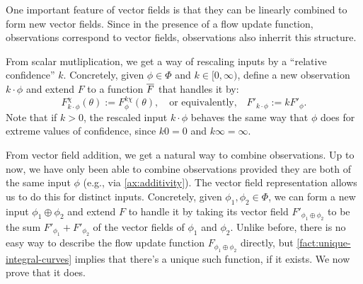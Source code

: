One important feature of vector fields is that they
can be linearly combined to form new vector fields.
Since in the presence of a flow update function,
observations correspond to vector fields,
observations also inherrit this structure.

From scalar mutliplication, we get a way of rescaling
inputs 
by a ``relative confidence'' $k
$.
Concretely, given $\phi \in \Phi$ and $k \in [0,\infty)$, 
define a new observation 
$k\cdot\phi$
and extend $F$ to
a function $\overline F$ that handles it by:
\[
	F^{\chi}_{k\cdot\phi}(\theta) := F^{k\chi}_{\phi}(\theta)
	,\quad\text{or equivalently,}\quad
	F'_{k\cdot \phi} := k F'_{\phi}
	.
\]
Note that if $k > 0$, the rescaled input
$k\cdot \phi$ behaves the same way that $\phi$
does for extreme values of confidence,
since $k 0 = 0$ and $k\infty = \infty$. 



From vector field addition, we get a natural way to combine observations.
Up to now, we have only been able to combine observations provided they are
both of the same input $\phi$ (e.g., via \cref{ax:additivity}).
The vector field representation allows us to do this for distinct inputs. 
Concretely,
given $\phi_1, \phi_2 \in \Phi$, we can form a new input 
$\phi_1 \oplus \phi_2$
and extend $F$ to handle it by taking 
its vector field 
$F'_{\phi_1 \oplus \phi_2}$
to be the sum $F'_{\phi_1} + F'_{\phi_2}$ of the vector fields of $\phi_1 $ and $\phi_2$.
Unlike before, there is no easy way to describe the
flow update function
$F_{\phi_1\oplus\phi_2}$ directly,
but \cref{fact:unique-integral-curves} implies that there's a unique
such function, if it exists.
We now prove that it does.

